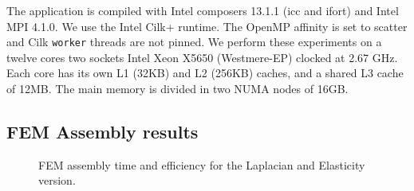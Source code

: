 \documentclass[10pt]{IOS-Book-Article}
\begin{document}
The application is compiled with Intel composers 13.1.1 (icc and ifort) and Intel MPI 4.1.0. We use the Intel Cilk+ runtime.
The OpenMP affinity is set to scatter and Cilk {\tt worker} threads are not pinned.
We perform these experiments on a twelve cores two sockets Intel Xeon X5650 (Westmere-EP) clocked at 2.67 GHz.
Each core has its own L1 (32KB) and L2 (256KB) caches, and a shared L3 cache of 12MB. The main memory is divided in two NUMA nodes of 16GB.

\subsection{FEM Assembly results}
\begin{figure}[htp]
 \caption{FEM assembly time and efficiency for the Laplacian and Elasticity version.}
 \label{fig:asmCurves}
\end{figure}
\end{document}
